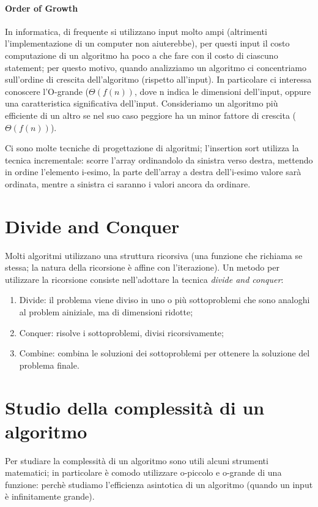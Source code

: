 \documentclass{article}
\begin{document}
\paragraph{Order of Growth}
In informatica, di frequente si utilizzano input molto ampi (altrimenti
l'implementazione di un computer non aiuterebbe), per questi input il costo
computazione di un algoritmo ha poco a che fare con il costo di ciascuno
statement; per questo motivo, quando analizziamo un algoritmo ci concentriamo
sull'ordine di crescita dell'algoritmo (rispetto all'input). In particolare ci
interessa conoscere l'O-grande ($\Theta(f(n))$, dove n indica le dimensioni
dell'input, oppure una caratteristica significativa dell'input.
Consideriamo un algoritmo più efficiente di un altro se nel suo caso peggiore ha
un minor fattore di crescita ($\Theta(f(n))$).

Ci sono molte tecniche di progettazione di algoritmi; l'insertion
sort utilizza la tecnica incrementale: scorre l'array ordinandolo da sinistra
verso destra, mettendo in ordine l'elemento i-esimo, la parte dell'array a
destra dell'i-esimo valore sarà ordinata, mentre a sinistra ci saranno i valori
ancora da ordinare.

\section{Divide and Conquer}
\label{sec:divide-and-conquer}
Molti algoritmi utilizzano una struttura ricorsiva (una funzione che richiama se
stessa; la natura della ricorsione è affine con l'iterazione). Un metodo per
utilizzare la ricorsione consiste nell'adottare la tecnica \textit{divide and
	conquer}:
\begin{enumerate}
	\item Divide: il problema viene diviso in uno o più sottoproblemi che sono
	      analoghi al problem ainiziale, ma di dimensioni ridotte;
	\item Conquer: risolve i sottoproblemi, divisi ricorsivamente;
	\item Combine: combina le soluzioni dei sottoproblemi per ottenere la
	      soluzione del problema finale.
\end{enumerate}

\section{Studio della complessità di un algoritmo}
Per studiare la complessità di un algoritmo sono utili alcuni strumenti
matematici; in particolare è comodo utilizzare o-piccolo e o-grande di una
funzione: perchè studiamo l'efficienza asintotica di un algoritmo (quando un
input è infinitamente grande).
\end{document}
